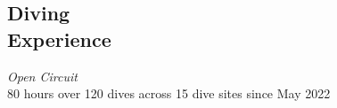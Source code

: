 \documentclass[line,margin]{res}
\begin{document}
\begin{resume}

\section{Diving\\Experience}
	{\sl Open Circuit}\\
		80 hours over 120 dives across 15 dive sites since May 2022




\end{resume}
\end{document}
